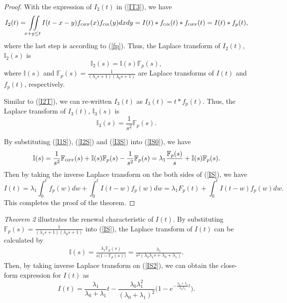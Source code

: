 \documentclass[11pt,draftcls]{IEEEtran}{\onecolumn}
\begin{document}
\begin{proof}
With the expression of $I_2(t)$ in (\ref{IT3}), we have
\begin{equation}
I_2(t)=\iint\limits_{x+y\le t}I(t-x-y)f_{\mbox{\tiny{OFF}}}(x)f_{\mbox{\tiny{ON}}}(y)dxdy
=I(t)\ast f_{\mbox{\tiny{ON}}}(t)\ast f_{\mbox{\tiny{OFF}}}(t)=I(t)\ast f_p(t),\label{I2T}
\end{equation}
where the last step is according to (\ref{fp}). Thus, the Laplace
transform of $I_2(t)$, $\mathbb{I}_2(s)$ is
\begin{equation}
\mathbb{I}_2(s)= \mathbb{I}(s) \mathbb{F}_p(s),\label{I2S}
\end{equation}
where $\mathbb{I}(s)$ and
$\mathbb{F}_p(s)=\frac{1}{(\lambda_1s+1)(\lambda_0s+1)}$ are Laplace
transforms of $I(t)$ and $f_p(t)$, respectively.

Similar to (\ref{I2T}), we can re-written $I_3(t)$ as $I_3(t)=t\ast
f_{p}(t)$. Thus, the Laplace transform of $I_3(t)$,
$\mathbb{I}_3(s)$ is
\begin{equation}
\mathbb{I}_3(s)= \frac{1}{s^2} \mathbb{F}_{p}(s).\label{I3S}
\end{equation}

By substituting (\ref{I1S}), (\ref{I2S}) and (\ref{I3S}) into
(\ref{IS0}), we have
\begin{equation}
\mathbb{I}(s)=\frac{1}{s^2}\mathbb{F}_{\mbox{\tiny{OFF}}}(s)+
\mathbb{I}(s)\mathbb{F}_p(s)-\frac{1}{s^2}\mathbb{F}_{p}(s)=\lambda_1 \frac{\mathbb{F}_p(s)}{s}+
\mathbb{I}(s) \mathbb{F}_p(s).\label{IS}
\end{equation}
Then by taking the inverse Laplace transform on the both sides of
(\ref{IS}), we have
\begin{equation}
I(t)=\lambda_1\int_{0}^{t}f_p(w)dw+\int_{0}^{t}I(t-w)f_p(w)dw=\lambda_1F_p(t)+\int_{0}^{t}I(t-w)f_p(w)dw.
\end{equation}
This completes the proof of the theorem.
\end{proof}

\emph{Theorem 2} illustrates the renewal characteristic of $I(t)$.
By substituting
$\mathbb{F}_p(s)=\frac{1}{(\lambda_1s+1)(\lambda_0s+1)}$ into
(\ref{IS}), the Laplace transform of $I(t)$ can be calculated by
\begin{eqnarray}
\mathbb{I}(s)=\frac{\lambda_1\mathbb{F}_p(s)}{s\Big(1-\mathbb{F}_p(s)\Big)}
= \frac{\lambda_1}{s^2(\lambda_0\lambda_1s+\lambda_0+\lambda_1)}.\label{IS2}
\end{eqnarray}
Then, by taking inverse Laplace transform on (\ref{IS2}), we can
obtain the close-form expression for $I(t)$ as
\begin{equation}\label{IT5}
I(t)=\frac{\lambda_1}{\lambda_0+\lambda_1}t-
\frac{\lambda_0\lambda_1^2}{(\lambda_0+\lambda_1)^2}\Big(1-e^{-\frac{\lambda_0+\lambda_1}{\lambda_0\lambda_1}t}\Big).
\end{equation}
\end{document}
